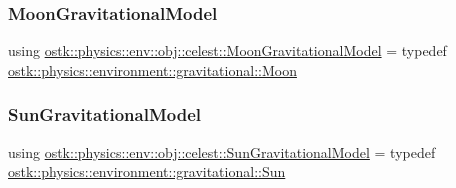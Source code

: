 \subsubsection{\texorpdfstring{Moon\+Gravitational\+Model}{MoonGravitationalModel}}
{\footnotesize\ttfamily using \hyperlink{namespaceostk_1_1physics_1_1env_1_1obj_1_1celest_afb39e52f5f405d447dae9362c9bdce04}{ostk\+::physics\+::env\+::obj\+::celest\+::\+Moon\+Gravitational\+Model} = typedef \hyperlink{classostk_1_1physics_1_1environment_1_1gravitational_1_1_moon}{ostk\+::physics\+::environment\+::gravitational\+::\+Moon}}

\mbox{\label{namespaceostk_1_1physics_1_1env_1_1obj_1_1celest_aeda0998cad8c59ab75aaf5f6ba0023f6}} 
\subsubsection{\texorpdfstring{Sun\+Gravitational\+Model}{SunGravitationalModel}}
{\footnotesize\ttfamily using \hyperlink{namespaceostk_1_1physics_1_1env_1_1obj_1_1celest_aeda0998cad8c59ab75aaf5f6ba0023f6}{ostk\+::physics\+::env\+::obj\+::celest\+::\+Sun\+Gravitational\+Model} = typedef \hyperlink{classostk_1_1physics_1_1environment_1_1gravitational_1_1_sun}{ostk\+::physics\+::environment\+::gravitational\+::\+Sun}}

